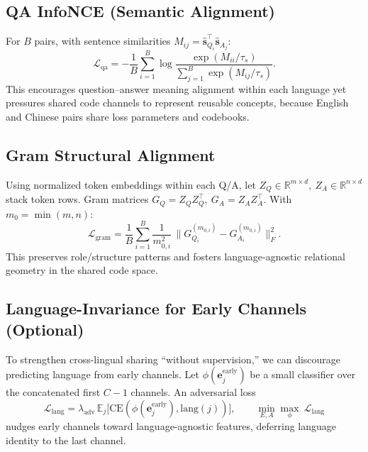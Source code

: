 \documentclass[11pt]{article}
\begin{document}
\subsection{QA InfoNCE (Semantic Alignment)}
For \(B\) pairs, with sentence similarities \(M_{ij}=\hat{\mathbf{s}}_{Q_i}^{\top}\hat{\mathbf{s}}_{A_j}\):
\begin{equation}
  \mathcal{L}_{\text{qa}}= -\frac{1}{B}\sum_{i=1}^B \log \frac{\exp(M_{ii}/\tau_s)}{\sum_{j=1}^B \exp(M_{ij}/\tau_s)}.\label{eq:qa}
\end{equation}
This encourages question--answer meaning alignment within each language yet pressures shared code channels to represent reusable concepts, because English and Chinese pairs share loss parameters and codebooks.

\subsection{Gram Structural Alignment}
Using normalized token embeddings within each Q/A, let
\(Z_Q\in\mathbb{R}^{m\times d},\ Z_A\in\mathbb{R}^{n\times d}\) stack token rows. Gram matrices \(G_Q=Z_QZ_Q^{\top},\ G_A=Z_AZ_A^{\top}\). With \(m_0=\min(m,n)\):
\begin{equation}
  \mathcal{L}_{\text{gram}}= \frac{1}{B}\sum_{i=1}^B \frac{1}{m_{0,i}^2}\,\big\lVert G_{Q_i}^{(m_{0,i})}-G_{A_i}^{(m_{0,i})}\big\rVert_F^2.\label{eq:gram}
\end{equation}
This preserves role/structure patterns and fosters language-agnostic relational geometry in the shared code space.

\subsection{Language-Invariance for Early Channels (Optional)}
To strengthen cross-lingual sharing ``without supervision,'' we can discourage predicting language from early channels. Let \(\phi(\mathbf{e}_j^{\text{early}})\) be a small classifier over the concatenated first \(C-1\) channels. An adversarial loss
\begin{equation}
  \mathcal{L}_{\text{lang}}= \lambda_{\text{adv}}\,\mathbb{E}_{j}\big[\mathrm{CE}(\phi(\mathbf{e}_j^{\text{early}}),\text{lang}(j))\big],\qquad \min_{E,A} \max_{\phi} \ \mathcal{L}_{\text{lang}}
\end{equation}
nudges early channels toward language-agnostic features, deferring language identity to the last channel.
\end{document}
